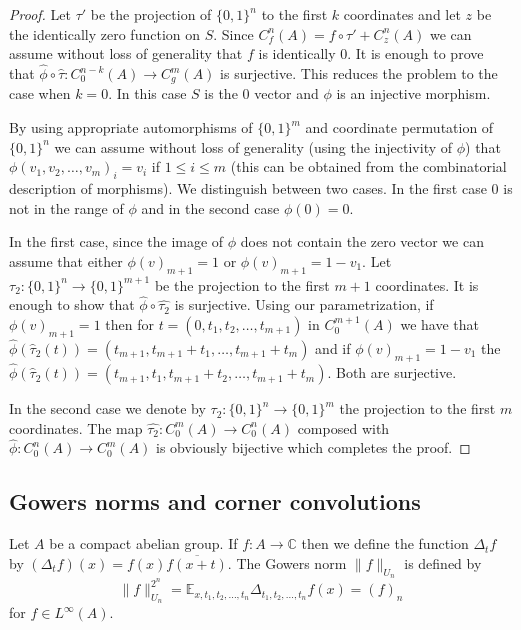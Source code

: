 \documentclass [11pt] {article}
\begin{document}
\begin{proof} Let $\tau'$ be the projection of $\{0,1\}^n$ to the first $k$ coordinates and let $z$ be the identically zero function on $S$. Since $C^n_f(A)=f\circ\tau'+C^n_z(A)$ we can assume without loss of generality that $f$ is identically $0$. It is enough to prove that $\hat{\phi}\circ\hat{\tau}:C^{n-k}_0(A)\rightarrow C_g^m(A)$ is surjective. This reduces the problem to the case when $k=0$. In this case $S$ is the $0$ vector and $\phi$ is an injective morphism.  


By using appropriate automorphisms of $\{0,1\}^m$ and coordinate permutation of $\{0,1\}^n$ we can assume without loss of generality  (using the injectivity of $\phi$) that $\phi(v_1,v_2,\dots,v_m)_i=v_i$ if $1\leq i\leq m$ (this can be obtained from the combinatorial description of morphisms). 
We distinguish between two cases. In the first case $0$ is not in the range of $\phi$ and in the second case $\phi(0)=0$. 

In the first case, since the image of $\phi$ does not contain the zero vector we can assume that either $\phi(v)_{m+1}=1$ or $\phi(v)_{m+1}=1-v_1$. Let $\tau_2:\{0,1\}^n\rightarrow\{0,1\}^{m+1}$ be the projection to the
 first $m+1$ coordinates.  
 It is enough to show that $\hat{\phi}\circ\hat{\tau_2}$ is surjective. Using our parametrization, if $\phi(v)_{m+1}=1$ then for  $t=(0,t_1,t_2,\dots,t_{m+1})$ in $C^{m+1}_0(A)$ we have that $\hat{\phi}(\hat{\tau}_2(t))=(t_{m+1},t_{m+1}+t_1,\dots,t_{m+1}+t_m)$ and if $\phi(v)_{m+1}=1-v_1$ the $\hat{\phi}(\hat{\tau}_2(t))=(t_{m+1},t_1,t_{m+1}+t_2,\dots,t_{m+1}+t_m)$. Both are surjective.
 
In the second case we denote by $\tau_2:\{0,1\}^n\rightarrow\{0,1\}^m$ the projection to the first $m$ coordinates. The map $\hat{\tau_2}:C^m_0(A)\rightarrow C^n_0(A)$ composed with $\hat{\phi}:C^n_0(A)\rightarrow C_0^m(A)$ is obviously bijective which completes the proof.
\end{proof}


\subsection{Gowers norms and corner convolutions}\label{chap:gc}

Let $A$ be a compact abelian group.
If $f:A\rightarrow\mathbb{C}$ then we define the function $\Delta_t f$ by $(\Delta_t f)(x)=f(x)\overline{f(x+t)}$.
The Gowers norm $\|f\|_{U_n}$ is defined by
\begin{equation}\label{gowersnorm}
\|f\|_{U_n}^{2^n}=\mathbb{E}_{x,t_1,t_2,\dots,t_n}\Delta_{t_1,t_2,\dots,t_n}f(x)=(f)_n
\end{equation}
for $f\in L^\infty(A)$.
\end{document}
